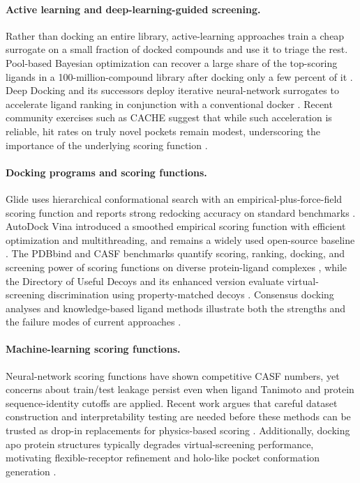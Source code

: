 \documentclass[10pt]{article}
\begin{document}
\paragraph{Active learning and deep-learning-guided screening.}
Rather than docking an entire library, active-learning approaches train a
cheap surrogate on a small fraction of docked compounds and use it to triage
the rest. Pool-based Bayesian optimization can recover a large share of the
top-scoring ligands in a 100-million-compound library after docking only a
few percent of it \citep{graff2021accelerating}. Deep Docking and its
successors deploy iterative neural-network surrogates to accelerate ligand
ranking in conjunction with a conventional docker
\citep{gentile2022deepdocking,yaacoub2022ddgui}. Recent community exercises
such as CACHE suggest that while such acceleration is reliable, hit rates on
truly novel pockets remain modest, underscoring the importance of the
underlying scoring function \citep{li2024cache}.

\paragraph{Docking programs and scoring functions.}
Glide uses hierarchical conformational search with an empirical-plus-force-field
scoring function and reports strong redocking accuracy on standard
benchmarks \citep{friesner2004glide}. AutoDock Vina introduced a smoothed
empirical scoring function with efficient optimization and multithreading,
and remains a widely used open-source baseline \citep{trott2010vina}. The
PDBbind and CASF benchmarks quantify scoring, ranking, docking, and
screening power of scoring functions on diverse protein-ligand complexes
\citep{liu2017pdbbind,su2019casf2016}, while the Directory of Useful Decoys
and its enhanced version evaluate virtual-screening discrimination using
property-matched decoys \citep{mysinger2012dude}. Consensus docking analyses
and knowledge-based ligand methods illustrate both the strengths and the
failure modes of current approaches \citep{chaput2017usc,ebejer2019ligity}.

\paragraph{Machine-learning scoring functions.}
Neural-network scoring functions have shown competitive CASF numbers, yet
concerns about train/test leakage persist even when ligand Tanimoto and
protein sequence-identity cutoffs are applied. Recent work argues that
careful dataset construction and interpretability testing are needed before
these methods can be trusted as drop-in replacements for physics-based
scoring \citep{scantlebury2023pointvs}. Additionally, docking apo protein
structures typically degrades virtual-screening performance, motivating
flexible-receptor refinement and holo-like pocket conformation generation
\citep{guterres2020apo}.
\end{document}
